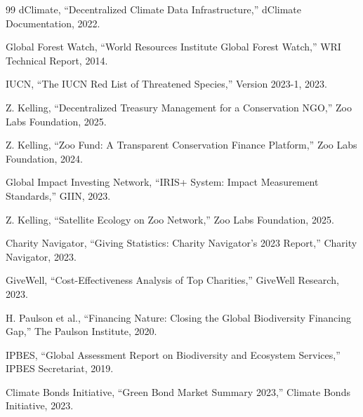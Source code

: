 \documentclass[11pt,letterpaper]{article}
\begin{document}
\begin{thebibliography}{99}
dClimate, ``Decentralized Climate Data Infrastructure,'' dClimate Documentation, 2022.

Global Forest Watch, ``World Resources Institute Global Forest Watch,'' WRI Technical Report, 2014.

IUCN, ``The IUCN Red List of Threatened Species,'' Version 2023-1, 2023.

Z. Kelling, ``Decentralized Treasury Management for a Conservation NGO,'' Zoo Labs Foundation, 2025.

Z. Kelling, ``Zoo Fund: A Transparent Conservation Finance Platform,'' Zoo Labs Foundation, 2024.

Global Impact Investing Network, ``IRIS+ System: Impact Measurement Standards,'' GIIN, 2023.

Z. Kelling, ``Satellite Ecology on Zoo Network,'' Zoo Labs Foundation, 2025.

Charity Navigator, ``Giving Statistics: Charity Navigator's 2023 Report,'' Charity Navigator, 2023.

GiveWell, ``Cost-Effectiveness Analysis of Top Charities,'' GiveWell Research, 2023.

H. Paulson et al., ``Financing Nature: Closing the Global Biodiversity Financing Gap,'' The Paulson Institute, 2020.

IPBES, ``Global Assessment Report on Biodiversity and Ecosystem Services,'' IPBES Secretariat, 2019.

Climate Bonds Initiative, ``Green Bond Market Summary 2023,'' Climate Bonds Initiative, 2023.

\end{thebibliography}
\end{document}
